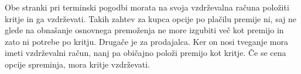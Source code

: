 \documentclass[a4paper]{article}
\begin{document}
Obe stranki pri terminski pogodbi morata na svoja vzdrževalna računa položiti kritje in ga vzdrževati. Takih zahtev za kupca opcije
po plačilu premije ni, saj ne glede na obnašanje osnovnega premoženja ne more izgubiti več kot premijo in zato ni potrebe po kritju.
Drugače je za prodajalca. Ker on nosi tveganje mora imeti vzdrževalni račun, nanj pa običajno položi premijo kot kritje. Če se cena 
opcije spreminja, mora kritje vzdrževati.  
\end{document}
